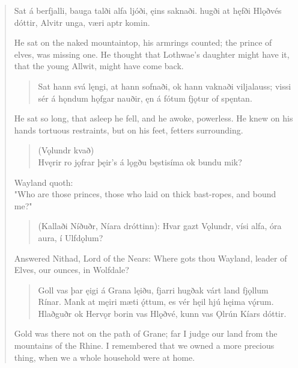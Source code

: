 \begin{verse}
\bva Sat á berfjalli, \hld bauga talði
alfa ljóði, \hld ęins saknaði.
hugði at hęfði \hld Hlǫðvés dóttir,
Alvitr unga, \hld væri aptr komin.
 
\bvb He sat on the naked mountaintop, his armrings counted; the prince of elves, was missing one. He thought that Lothwae's daughter might have it, that the young Allwit, might have come back.

\begin{verse}
\bva Sat hann svá lęngi, \hld at hann sofnaði,
ok hann vaknaði \hld viljalauss;
vissi sér á hǫndum \hld hǫfgar nauðir,
ęn á fótum \hld fjǫtur of spęntan. \\%
\end{verse}

\bvb He sat so long, that asleep he fell, and he awoke, powerless. He knew on his hands tortuous restraints, but on his feet, fetters surrounding.

\begin{verse}
(Vǫlundr kvað) \\
\bva Hvęrir ro jǫfrar \hld þęir's á lǫgðu
bęstisíma \hld ok bundu mik? \\%
\end{verse}

\bvb Wayland quoth: \\
"Who are those princes, those who laid on thick bast-ropes, and bound me?"

\begin{verse}
\bva (Kallaði Níðuðr, \hld Níara dróttinn):
Hvar gazt Vǫlundr, \hld vísi alfa,
óra aura, \hld í Ulfdǫlum? \\%

\end{verse}

\bvb Answered Nithad, Lord of the Nears: Where gots thou Wayland, leader of Elves, our ounces, in Wolfdale?

\begin{verse}
\bva Goll vas þar ęigi \hld á Grana lęiðu,
fjarri hugðak várt land \hld fjǫllum Rínar.
Mank at męiri \hld mæti ǫ́ttum,
es vér hęil hjú \hld hęima vǫ́rum. \\%
Hlaðguðr ok Hervǫr \hld borin vas Hlǫðvé,
kunn vas Ǫlrún \hld Kíars dóttir.  \\%
\end{verse}

\bvb Gold was there not on the path of Grane; far I judge our land from the mountains of the Rhine. I remembered that we owned a more precious thing, when we a whole household were at home.


\end{verse}
